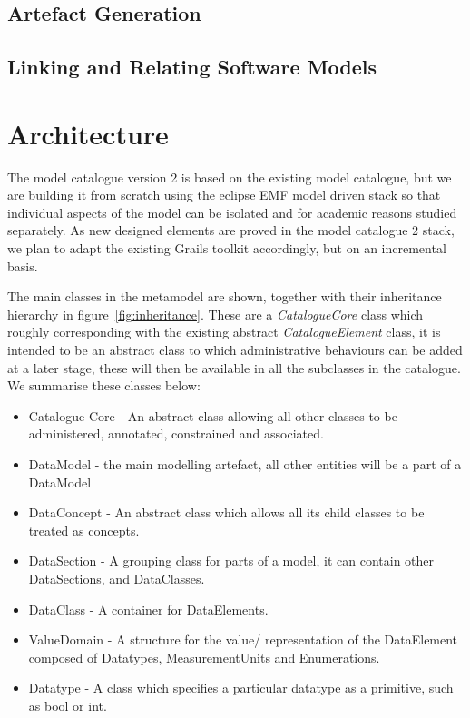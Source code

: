 \documentclass{article}
\begin{document}
\subsection{Artefact Generation}

\subsection{Linking and Relating Software Models}



 




\section{Architecture}

The model catalogue version 2 is based on the existing model catalogue, but we are building it from scratch using the eclipse EMF model driven stack so that individual aspects of the model can be isolated and for academic reasons studied separately. As new designed elements are proved in the model catalogue 2 stack, we plan to adapt the existing Grails toolkit accordingly, but on an incremental basis.

The main classes in the metamodel are shown, together with their inheritance hierarchy in figure~\ref{fig:inheritance}. These are a \emph{CatalogueCore} class which roughly corresponding with the existing abstract \emph{CatalogueElement} class, it is intended to be an abstract class to which administrative behaviours can be added at a later stage, these will then be available in all the subclasses in the catalogue. We summarise these classes below:
\begin{itemize}
\item Catalogue Core - An abstract class allowing all other classes to be administered, annotated, constrained and associated.
\item DataModel - the main modelling artefact, all other entities will be a part of a DataModel
\item DataConcept - An abstract class which allows all its child classes to be treated as concepts.
\item DataSection - A grouping class for parts of a model, it can contain other DataSections, and DataClasses.
\item DataClass - A container for DataElements.
\item ValueDomain - A structure for the value/ representation of the DataElement composed of Datatypes, MeasurementUnits and Enumerations.
\item Datatype - A class which specifies a particular datatype as a primitive, such as bool or int.
\end{itemize}
\end{document}
